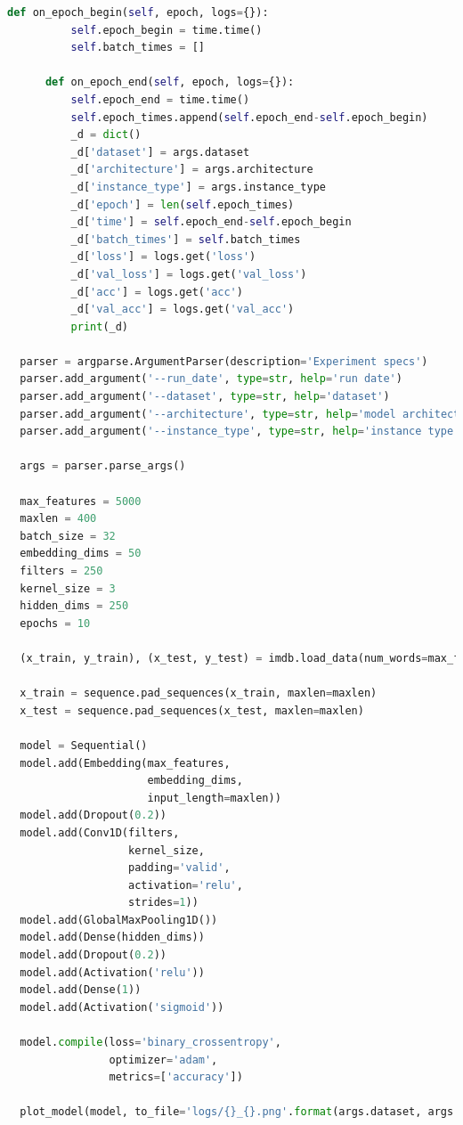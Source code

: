 \documentclass[12pt,a4paper,twoside]{article}
\begin{document}
\begin{appendices}
\begin{lstlisting}[language=python]
      def on_epoch_begin(self, epoch, logs={}):
          self.epoch_begin = time.time()
          self.batch_times = []

      def on_epoch_end(self, epoch, logs={}):
          self.epoch_end = time.time()
          self.epoch_times.append(self.epoch_end-self.epoch_begin)
          _d = dict()
          _d['dataset'] = args.dataset
          _d['architecture'] = args.architecture
          _d['instance_type'] = args.instance_type
          _d['epoch'] = len(self.epoch_times)
          _d['time'] = self.epoch_end-self.epoch_begin
          _d['batch_times'] = self.batch_times
          _d['loss'] = logs.get('loss')
          _d['val_loss'] = logs.get('val_loss')
          _d['acc'] = logs.get('acc')
          _d['val_acc'] = logs.get('val_acc')
          print(_d)

  parser = argparse.ArgumentParser(description='Experiment specs')
  parser.add_argument('--run_date', type=str, help='run date')
  parser.add_argument('--dataset', type=str, help='dataset')
  parser.add_argument('--architecture', type=str, help='model architecture')
  parser.add_argument('--instance_type', type=str, help='instance type')

  args = parser.parse_args()

  max_features = 5000
  maxlen = 400
  batch_size = 32
  embedding_dims = 50
  filters = 250
  kernel_size = 3
  hidden_dims = 250
  epochs = 10

  (x_train, y_train), (x_test, y_test) = imdb.load_data(num_words=max_features)

  x_train = sequence.pad_sequences(x_train, maxlen=maxlen)
  x_test = sequence.pad_sequences(x_test, maxlen=maxlen)

  model = Sequential()
  model.add(Embedding(max_features,
                      embedding_dims,
                      input_length=maxlen))
  model.add(Dropout(0.2))
  model.add(Conv1D(filters,
                   kernel_size,
                   padding='valid',
                   activation='relu',
                   strides=1))
  model.add(GlobalMaxPooling1D())
  model.add(Dense(hidden_dims))
  model.add(Dropout(0.2))
  model.add(Activation('relu'))
  model.add(Dense(1))
  model.add(Activation('sigmoid'))

  model.compile(loss='binary_crossentropy',
                optimizer='adam',
                metrics=['accuracy'])

  plot_model(model, to_file='logs/{}_{}.png'.format(args.dataset, args.architecture))


\end{lstlisting}
\end{appendices}
\end{document}
